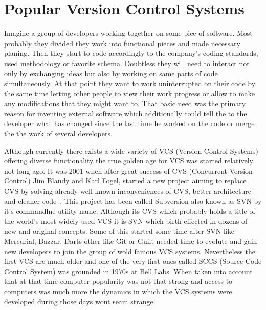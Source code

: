 \section{Popular Version Control Systems}\label{sec:popular_vcs}
Imagine a group of developers working together on some pice of software.  Most probably they divided they work into functional pieces and made necessary planing. Then they start to code accordingly to the company's coding standards, used methodology or favorite schema. Doubtless they will need to interact not only by exchanging ideas but also by working on same parts of code simultaneously.  At that point they want to work uninterrupted on their code by the same time letting other people to view their work progress or allow to make any modifications that they might want to. That basic need was the primary reason for inventing external software which additionally could tell the to the developer what has changed since the last time he worked on the code or merge the the work of several developers. 

Although currently there exists a wide variety of VCS (Version Control Systems) offering diverse functionality the true golden age for VCS was started relatively not long ago. It was 2001 when after great success of CVS (Concurrent Version Control) Jim Blandy and Karl Fogel, started a new project aiming to replace CVS by solving already well known inconveniences of CVS, better architecture and cleaner code~\cite[page 11]{hg_book}. This project has been called Subversion also known as SVN by it's commandlne utility name. Although its CVS which probably holds a title of the world's most widely used VCS it is SVN which birth effected in dozens of new and original concepts. Some of this started some time after SVN like Mercurial, Bazzar, Darts other like Git or Guilt needed time to evolute and gain new developers to join the group of wold famous VCS systems. Nevertheless the first VCS are much older and one of the very first ones called SCCS (Source Code Control System) was grounded in 1970s at Bell Labs. When taken into account that at that time computer popularity was not that strong and access to computers was much more the dynamics in which the VCS systems were developed during those days wont seam strange. 
